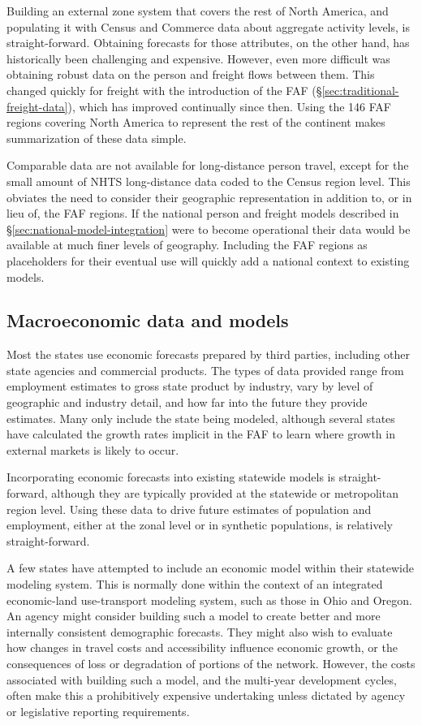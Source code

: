Building an external zone system that covers the rest of North America, and populating it with Census and Commerce data about aggregate activity levels, is straight-forward. Obtaining forecasts for those attributes, on the other hand, has historically been challenging and expensive. However, even more difficult was obtaining robust data on the person and freight flows between them. This changed quickly for freight with the introduction of the FAF (\S\ref{sec:traditional-freight-data}), which has improved continually since then. Using the 146 FAF regions covering North America to represent the rest of the continent makes summarization of these data simple.

Comparable data are not available for long-distance person travel, except for the small amount of NHTS long-distance data coded to the Census region level. This obviates the need to consider their geographic representation in addition to, or in lieu of, the FAF regions. If the national person and freight models described in \S\ref{sec:national-model-integration} were to become operational their data would be available at much finer levels of geography. Including the FAF regions as placeholders for their eventual use will quickly add a national context to existing models.

\subsection{Macroeconomic data and models}

Most the states use economic forecasts prepared by third parties, including other state agencies and commercial products. The types of data provided range from employment estimates to gross state product by industry, vary by level of geographic and industry detail, and how far into the future they provide estimates. Many only include the state being modeled, although several states have calculated the growth rates implicit in the FAF to learn where growth in external markets is likely to occur.

Incorporating economic forecasts into existing statewide models is straight-forward, although they are typically provided at the statewide or metropolitan region level. Using these data to drive future estimates of population and employment, either at the zonal level or in synthetic populations, is relatively straight-forward.

A few states have attempted to include an economic model within their statewide modeling system. This is normally done within the context of an integrated economic-land use-transport modeling system, such as those in Ohio and Oregon. An agency might consider building such a model to create better and more internally consistent demographic forecasts. They might also wish to evaluate how changes in travel costs and accessibility influence economic growth, or the consequences of loss or degradation of portions of the network. However, the costs associated with building such a model, and the multi-year development cycles, often make this a prohibitively expensive undertaking unless dictated by agency or legislative reporting requirements.

